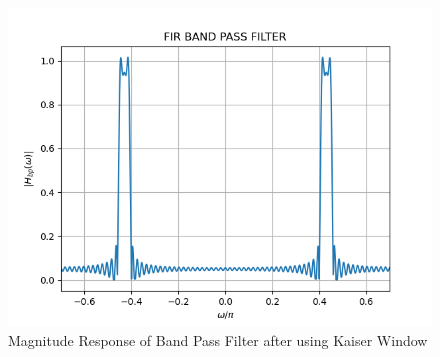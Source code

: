\documentclass{article}
\begin{document}
\begin{figure}[H]
\centering
\includegraphics[width=1\columnwidth]{figs/FIR_Bandpass_Filter.png}
\caption{Magnitude Response of Band Pass Filter after using Kaiser Window}
\label{fig:Kaiser_BPF_response}
\end{figure}
\end{document}
